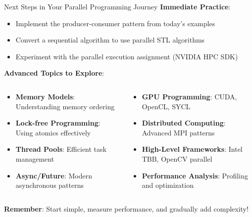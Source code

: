 \begin{frame}[fragile]{ Next Steps in Your Parallel Programming Journey}
	\textbf{Immediate Practice}:
	\begin{itemize}
		\item Implement the producer-consumer pattern from today's examples
		\item Convert a sequential algorithm to use parallel STL algorithms
		\item Experiment with the parallel execution assignment (NVIDIA HPC SDK)
	\end{itemize}

	\vspace{1em}
	\textbf{Advanced Topics to Explore}:
	\begin{columns}
		\begin{column}{0.5\textwidth}
			\begin{itemize}
				\item \textbf{Memory Models}: Understanding memory ordering
				\item \textbf{Lock-free Programming}: Using atomics effectively
				\item \textbf{Thread Pools}: Efficient task management
				\item \textbf{Async/Future}: Modern asynchronous patterns
			\end{itemize}
		\end{column}
		\begin{column}{0.5\textwidth}
			\begin{itemize}
				\item \textbf{GPU Programming}: CUDA, OpenCL, SYCL
				\item \textbf{Distributed Computing}: Advanced MPI patterns
				\item \textbf{High-Level Frameworks}: Intel TBB, OpenCV parallel
				\item \textbf{Performance Analysis}: Profiling and optimization
			\end{itemize}
		\end{column}
	\end{columns}

	\vspace{1em}
	\textbf{Remember}: Start simple, measure performance, and gradually add complexity!
\end{frame}
